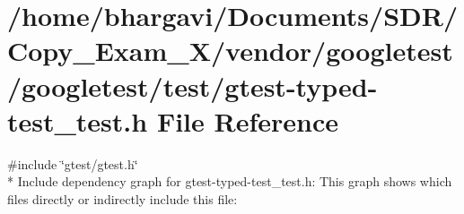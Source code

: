 \hypertarget{gtest-typed-test__test_8h}{}\section{/home/bhargavi/\+Documents/\+S\+D\+R/\+Copy\+\_\+\+Exam\+\_\+X/vendor/googletest/googletest/test/gtest-\/typed-\/test\+\_\+test.h File Reference}
\label{gtest-typed-test__test_8h}
{\ttfamily \#include \char`\"{}gtest/gtest.\+h\char`\"{}}\\*
Include dependency graph for gtest-\/typed-\/test\+\_\+test.h\+:
This graph shows which files directly or indirectly include this file\+:
